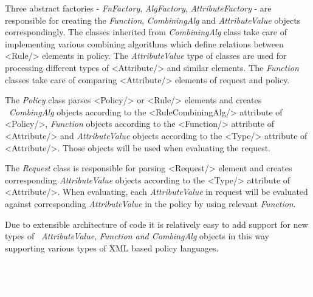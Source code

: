 \documentclass[a4paper]{article}
\begin{document}
{\upshape\color{black}
Three abstract factories - \textit{FnFactory}, \textit{AlgFactory},
\textit{AttributeFactory} - are responsible for creating the
\textit{Function}, \textit{CombiningAlg} and \textit{AttributeValue}
objects correspondingly. The classes inherited from
\textit{CombiningAlg} class take care of implementing various combining
algorithms which define relations between
{\textless}Rule/{\textgreater} elements in policy. The
\textit{AttributeValue} type of classes are used for processing
different types of {\textless}Attribute/{\textgreater} and similar
elements. The \textit{Function} classes take care of comparing
{\textless}Attribute/{\textgreater} elements of request and policy. }

{\upshape\color{black}
The \textit{Policy} class parses {\textless}Policy/{\textgreater} or
{\textless}Rule/{\textgreater} elements and creates
\ \textit{CombingAlg} objects according to the
{\textless}RuleCombiningAlg/{\textgreater} attribute of
{\textless}Policy/{\textgreater}, \textit{Function} objects according
to the {\textless}Function/{\textgreater} attribute of
{\textless}Attribute/{\textgreater} and \textit{AttributeValue} objects
according to the {\textless}Type/{\textgreater} attribute of
{\textless}Attribute/{\textgreater}. Those objects will be used when
evaluating the request.}

{\upshape\color{black}
The \textit{Request} class is responsible for parsing
{\textless}Request/{\textgreater} element and creates corresponding
\textit{AttributeValue} objects according to the
{\textless}Type/{\textgreater} attribute of
{\textless}Attribute/{\textgreater}. When evaluating, each
\textit{AttributeValue} in request will be evaluated against
corresponding \textit{AttributeValue} in the policy by using relevant
\textit{Function}.}

{\upshape\color{black}
Due to extensible architecture of code it is relatively easy to add
support for new types of \ \textit{AttributeValue}, \textit{Function
and CombingAlg} objects in this way supporting various types of XML
based policy languages.}


\includegraphics[width=0.0161in,height=0.0161in]{SecurityFrameworkofARC1-img3.png}

\includegraphics[width=0.0161in,height=0.0161in]{SecurityFrameworkofARC1-img4.png}
\end{document}
